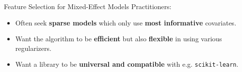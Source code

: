\documentclass[8pt]{beamer}
\begin{document}


\begin{frame}{Feature Selection for Mixed-Effect Models}
Practitioners:
\begin{itemize}
	\item<1-> Often seek \textbf{sparse models} which only use \textbf{most informative} covariates. 
	\item<2-> Want the algorithm to be \textbf{efficient} but also \textbf{flexible} in using various regularizers.
	\item<3-> Want a library to be \textbf{universal and compatible} with e.g. \texttt{scikit-learn}.
\end{itemize}
\vspace{1em}

\end{frame}
\end{document}
